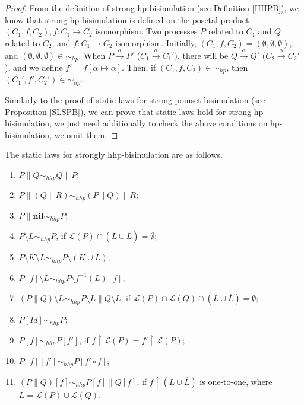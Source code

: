 \begin{proof}
From the definition of strong hp-bisimulation (see Definition \ref{HHPB}), we know that strong hp-bisimulation is defined on the posetal product $(C_1,f,C_2),f:C_1\rightarrow C_2\textrm{ isomorphism}$. Two processes $P$ related to $C_1$ and $Q$ related to $C_2$, and $f:C_1\rightarrow C_2\textrm{ isomorphism}$. Initially, $(C_1,f,C_2)=(\emptyset,\emptyset,\emptyset)$, and $(\emptyset,\emptyset,\emptyset)\in\sim_{hp}$. When $P\xrightarrow{\alpha}P'$ ($C_1\xrightarrow{\alpha}C_1'$), there will be $Q\xrightarrow{\alpha}Q'$ ($C_2\xrightarrow{\alpha}C_2'$), and we define $f'=f[\alpha\mapsto \alpha]$. Then, if $(C_1,f,C_2)\in\sim_{hp}$, then $(C_1',f',C_2')\in\sim_{hp}$.

Similarly to the proof of static laws for strong pomset bisimulation (see Proposition \ref{SLSPB}), we can prove that static laws hold for strong hp-bisimulation, we just need additionally to check the above conditions on hp-bisimulation, we omit them.
\end{proof}

\begin{proposition} \label{SLSHHPB}
The static laws for strongly hhp-bisimulation are as follows.
\begin{enumerate}
  \item $P\parallel Q\sim_{hhp} Q\parallel P$;
  \item $P\parallel(Q\parallel R)\sim_{hhp} (P\parallel Q)\parallel R$;
  \item $P\parallel \textbf{nil}\sim_{hhp} P$;
  \item $P\setminus L\sim_{hhp} P$, if $\mathcal{L}(P)\cap(L\cup\overline{L})=\emptyset$;
  \item $P\setminus K\setminus L\sim_{hhp} P\setminus(K\cup L)$;
  \item $P[f]\setminus L\sim_{hhp} P\setminus f^{-1}(L)[f]$;
  \item $(P\parallel Q)\setminus L\sim_{hhp} P\setminus L\parallel Q\setminus L$, if $\mathcal{L}(P)\cap\overline{\mathcal{L}(Q)}\cap(L\cup\overline{L})=\emptyset$;
  \item $P[Id]\sim_{hhp} P$;
  \item $P[f]\sim_{hhp} P[f']$, if $f\upharpoonright\mathcal{L}(P)=f'\upharpoonright\mathcal{L}(P)$;
  \item $P[f][f']\sim_{hhp} P[f'\circ f]$;
  \item $(P\parallel Q)[f]\sim_{hhp} P[f]\parallel Q[f]$, if $f\upharpoonright(L\cup\overline{L})$ is one-to-one, where $L=\mathcal{L}(P)\cup\mathcal{L}(Q)$.
\end{enumerate}
\end{proposition}

